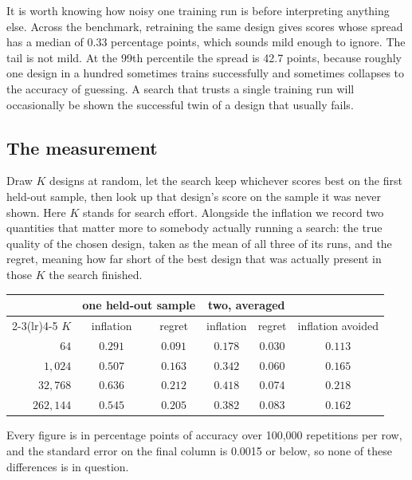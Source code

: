 \documentclass[11pt]{article}
\begin{document}
It is worth knowing how noisy one training run is before interpreting anything else. Across the
benchmark, retraining the same design gives scores whose spread has a median of 0.33 percentage points,
which sounds mild enough to ignore. The tail is not mild. At the 99th percentile the spread is 42.7
points, because roughly one design in a hundred sometimes trains successfully and sometimes collapses to
the accuracy of guessing. A search that trusts a single training run will occasionally be shown the
successful twin of a design that usually fails.

\subsection{The measurement}

Draw $K$ designs at random, let the search keep whichever scores best on the first held-out sample, then
look up that design's score on the sample it was never shown. Here $K$ stands for search effort.
Alongside the inflation we record two quantities that matter more to somebody actually running a search:
the true quality of the chosen design, taken as the mean of all three of its runs, and the regret,
meaning how far short of the best design that was actually present in those $K$ the search finished.

\begin{center}
\begin{tabular}{rccccc}
\toprule
 & \multicolumn{2}{c}{one held-out sample} & \multicolumn{2}{c}{two, averaged} & \\
\cmidrule(lr){2-3}\cmidrule(lr){4-5}
$K$ & inflation & regret & inflation & regret & inflation avoided \\
\midrule
$64$        & $0.291$ & $0.091$ & $0.178$ & $0.030$ & $0.113$ \\
$1{,}024$   & $0.507$ & $0.163$ & $0.342$ & $0.060$ & $0.165$ \\
$32{,}768$  & $0.636$ & $0.212$ & $0.418$ & $0.074$ & $0.218$ \\
$262{,}144$ & $0.545$ & $0.205$ & $0.382$ & $0.083$ & $0.162$ \\
\bottomrule
\end{tabular}
\end{center}

Every figure is in percentage points of accuracy over 100,000 repetitions per row, and the standard
error on the final column is 0.0015 or below, so none of these differences is in question.
\end{document}
